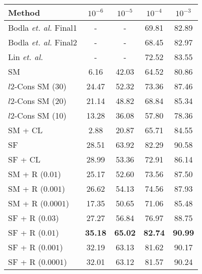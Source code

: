 \documentclass[10pt,twocolumn,letterpaper]{article}
\begin{document}
\begin{table}
\hfill
\centering
\begin{tabular}{l c c c c} %

\hline\hline %


Method  & $10^{-6}$  &  $10^{-5}$    &  $10^{-4} $   &  $10^{-3}$    \\
\hline %

Bodla \emph{et. al.} Final1 \cite{bodla2017deep}   &  -  & -   &  69.81  & 82.89    \\
Bodla \emph{et. al.} Final2 \cite{bodla2017deep}   &  -   &  -   &  68.45  & 82.97   \\

Lin \emph{et. al.}  \cite{lin2017proximity}    &  -  &  -  & 72.52   &  83.55 \\

\hline
\hline
SM  &  6.16   & 42.03    & 64.52    &  80.86   \\ 
$l2$-Cons SM (30)  \cite{ranjan2017l2}&  24.47  & 52.32   & 73.36    &  87.46  \\ 
$l2$-Cons SM (20)  \cite{ranjan2017l2}&  21.14  & 48.82  &   68.84  &  85.34    \\ 
$l2$-Cons SM (10)  \cite{ranjan2017l2}& 13.28  & 36.08  & 57.80  & 78.36   \\ 
SM + CL \cite{wen2016discriminative} &  2.88  & 20.87   &  65.71    &  84.55   \\ 
SF  \cite{liu2017sphereface} &  28.51   &  63.92 &   82.29  &  90.58  \\
SF + CL \cite{wen2016discriminative, liu2017sphereface}  &  28.99  &    53.36    &  72.91  &    86.14 \\

\hline

SM + R ($0.01$)   & 25.17  & 52.60  & 73.56  &  87.50  \\
SM + R  ($0.001$)  &  26.62 &  54.13    & 74.56    &  87.93     \\ 
SM + R  ($0.0001$)  & 17.35 &  50.65   &  71.06  &  85.48   \\ 
\hline
SF + R  ($0.03$)  &   27.27  &  56.84    &  76.97   &  88.75   \\ 
SF + R  ($0.01$)  & \textbf{ 35.18 } &  \textbf{65.02}  &\textbf{ 82.74 } &   \textbf{90.99 }    \\ 
SF + R  ($0.001$)  & 32.19    &  63.13     &    81.62   &  90.17   \\
SF + R  ($0.0001$)  &   32.01  & 63.12    & 81.57   &  90.24  \\ 


\end{tabular}
\end{table}
\end{document}
